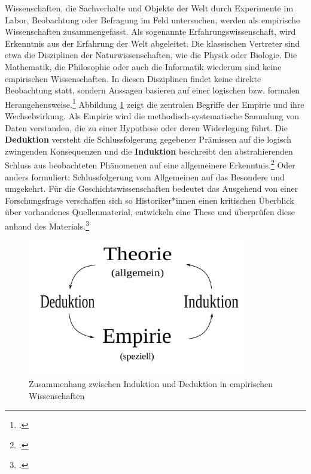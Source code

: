 \documentclass[12pt,a4paper]{article}
\begin{document}
Wissenschaften, die Sachverhalte und Objekte der Welt durch Experimente im Labor, Beobachtung oder Befragung im Feld untersuchen, werden als empirische Wissenschaften zusammengefasst.  Als sogenannte Erfahrungswissenschaft, wird Erkenntnis aus der Erfahrung der Welt abgeleitet. Die klassischen Vertreter sind etwa die Disziplinen der Naturwissenschaften, wie die Physik oder Biologie. Die Mathematik, die Philosophie oder auch die Informatik wiederum sind keine empirischen Wissenschaften. In diesen Disziplinen findet keine direkte Beobachtung statt, sondern Aussagen basieren auf einer logischen bzw. formalen Herangehensweise.\footcite[08.11.2019]{frommergrundbegriffe} Abbildung \ref{fig:empirismus} zeigt die zentralen Begriffe der Empirie und ihre Wechselwirkung. Als Empirie wird die methodisch-systematische Sammlung von Daten verstanden, die zu einer Hypothese oder deren Widerlegung führt. Die \textbf{Deduktion} versteht die Schlussfolgerung gegebener Prämissen auf die logisch zwingenden Konsequenzen und die \textbf{Induktion} beschreibt den abstrahierenden Schluss aus beobachteten Phänomenen auf eine allgemeinere Erkenntnis.\footcite[Siehe][]{chalmers2007wege}
Oder anders formuliert: Schlussfolgerung vom Allgemeinen auf das Besondere und umgekehrt. Für die Geschichtswissenschaften bedeutet das Ausgehend von einer Forschungsfrage verschaffen sich so Historiker*innen einen kritischen Überblick über  vorhandenes Quellenmaterial, entwickeln eine These und überprüfen diese anhand des Materials.\footcite[][S.45-46]{jordan2018theorien}
\begin{figure}[H]
\centering
	\includegraphics[width=0.85\textwidth]{img/emprisimus.png}  
    \caption[Zusammenhang zwischen Induktion und Deduktion in empirischen Wissenschaften, \protect\url{https://de.wikipedia.org/wiki/Empirie\#/media/Datei:Induktion-Deduktion.svg}, 09.11.2019.]{Zusammenhang zwischen Induktion und Deduktion in empirischen Wissenschaften} \label{fig:empirismus}
\end{figure}
\end{document}
